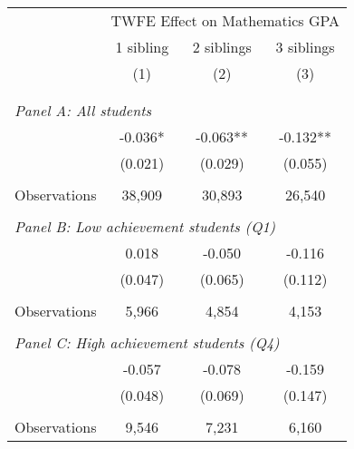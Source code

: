 \makeatletter
{}
{
\makeatother
\begin{tabular}{lccc}
\toprule
\cmidrule(lr){2-4}
& \multicolumn{3}{c}{TWFE Effect on Mathematics GPA} \\
\cmidrule(lr){2-4}
& 1 sibling & 2 siblings & 3 siblings  \\
\cmidrule(lr){2-2} \cmidrule(lr){3-3} \cmidrule(lr){4-4}
& (1) & (2) & (3)\\
\bottomrule
&  &  &  \\
&  &  &   \\
\multicolumn{4}{l}{\textit{Panel A: All students}} \\
\hspace{3mm}        &      -0.036*  &      -0.063** &      -0.132** \\
                    &     (0.021)   &     (0.029)   &     (0.055)   \\
                    &               &               &               \\
\hspace{3mm}Observations&      38,909   &      30,893   &      26,540   \\
 
&  &  &   \\
\multicolumn{4}{l}{\textit{Panel B: Low achievement students (Q1)}} \\
\hspace{3mm}        &       0.018   &      -0.050   &      -0.116   \\
                    &     (0.047)   &     (0.065)   &     (0.112)   \\
                    &               &               &               \\
\hspace{3mm}Observations&       5,966   &       4,854   &       4,153   \\
 
&  &  &   \\
\multicolumn{4}{l}{\textit{Panel C: High achievement students (Q4)}} \\
\hspace{3mm}        &      -0.057   &      -0.078   &      -0.159   \\
                    &     (0.048)   &     (0.069)   &     (0.147)   \\
                    &               &               &               \\
\hspace{3mm}Observations&       9,546   &       7,231   &       6,160   \\
 

\end{tabular}}

